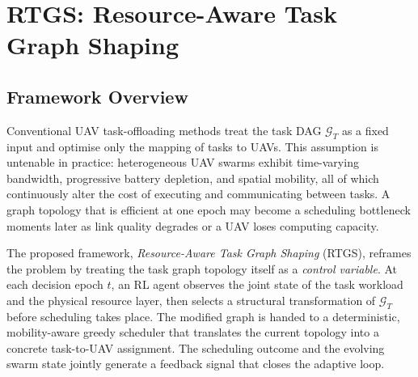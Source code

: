 %
%

\section{RTGS: Resource-Aware Task Graph Shaping}
\label{sec:method}

\subsection{Framework Overview}
\label{subsec:overview}

Conventional UAV task-offloading methods treat the task DAG
$\mathcal{G}_T$ as a fixed input and optimise only the mapping
of tasks to UAVs.
This assumption is untenable in practice: heterogeneous UAV swarms
exhibit time-varying bandwidth, progressive battery depletion, and
spatial mobility, all of which continuously alter the cost of
executing and communicating between tasks.
A graph topology that is efficient at one epoch may become a
scheduling bottleneck moments later as link quality degrades or a UAV
loses computing capacity.

The proposed framework, \emph{Resource-Aware Task Graph Shaping}
(RTGS), reframes the problem by treating the task graph topology
itself as a \emph{control variable}.
At each decision epoch $t$, an RL agent observes the joint state of
the task workload and the physical resource layer, then selects a
structural transformation of $\mathcal{G}_T$ before scheduling takes
place.
The modified graph is handed to a deterministic, mobility-aware
greedy scheduler that translates the current topology into a concrete
task-to-UAV assignment.
The scheduling outcome and the evolving swarm state jointly generate
a feedback signal that closes the adaptive loop.

